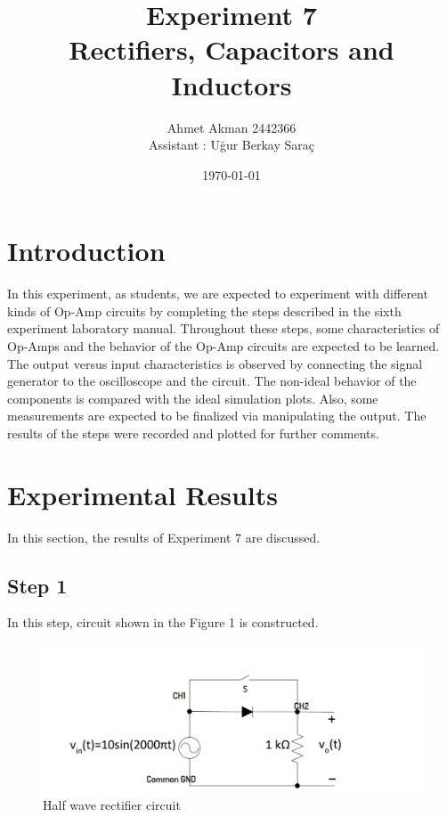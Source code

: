 \documentclass[letterpaper,12pt]{article}
\begin{document}
\title{Experiment 7 \protect\\Rectifiers, Capacitors and Inductors}
\author{Ahmet Akman 2442366 \protect\\ Assistant : Uğur Berkay Saraç}
\date{\today}
\maketitle
\newpage
\tableofcontents
\newpage

\section{Introduction} 
In this experiment, as students, we are expected to experiment with different kinds of Op-Amp circuits by completing the steps described in the sixth experiment laboratory manual. Throughout these steps, some characteristics of Op-Amps and the behavior of the Op-Amp circuits are expected to be learned. The output versus input characteristics is observed by connecting the signal generator to the oscilloscope and the circuit. The non-ideal behavior of the components is compared with the ideal simulation plots. Also, some measurements are expected to be finalized via manipulating the output. The results of the steps were recorded and plotted for further comments.
\section{Experimental Results}
In this section, the results of Experiment 7 are discussed. 
\subsection{Step 1}
In this step, circuit shown in the Figure 1  is constructed. 
\begin{figure}[H]
	\centering
   \includegraphics[width=1\textwidth]{half_vave_sch.png}
   \caption{Half wave rectifier circuit}
\end{figure}
\end{document}
